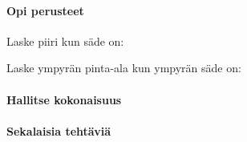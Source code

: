 \begin{tehtavasivu}

\paragraph*{Opi perusteet}

\begin{tehtava}
Laske piiri kun säde on:
\begin{alakohdat}
\end{alakohdat}
\begin{vastaus}
\begin{alakohdat}
\end{alakohdat}
\end{vastaus}
\end{tehtava}

\begin{tehtava}
Laske ympyrän pinta-ala kun ympyrän säde on:
\begin{alakohdat}
\end{alakohdat}

\begin{vastaus}
\begin{alakohdat}
\end{alakohdat}
\end{vastaus}
\end{tehtava}


\paragraph*{Hallitse kokonaisuus}

\paragraph*{Sekalaisia tehtäviä}

\end{tehtavasivu}
